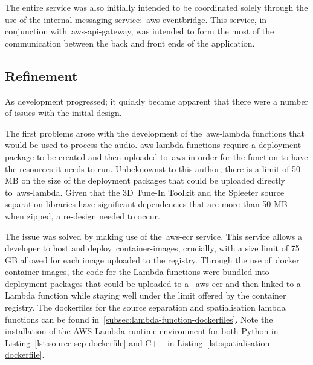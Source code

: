 The entire service was also initially intended
to be coordinated solely through the use of the internal messaging service:~\gls{aws-eventbridge}.
This service, in conjunction with~\gls{aws-api-gateway},
was intended to form the most of the communication between the back and front ends of the application.

\subsection{Refinement}\label{subsec:refinement}

As development progressed; it quickly became apparent that there were a number of issues with the initial design.

The first problems arose with the development of the~\gls{aws-lambda} functions that would be used to process the audio.
\gls{aws-lambda} functions
require a deployment package to be created
and then uploaded to~\gls{aws} in order for the function to have the resources it needs to run.
Unbeknownst to this author,
there is a limit of 50 MB on the size of the deployment packages that could be uploaded directly to~\gls{aws-lambda}.
Given that the 3D Tune-In Toolkit and the Spleeter source separation libraries have significant dependencies
that are more than 50 MB when zipped, a re-design needed to occur.

The issue was solved by making use of the~\gls{aws-ecr} service.
This service allows a developer to host and deploy~\glspl{container-image},
crucially, with a size limit of 75 GB allowed for each image uploaded to the registry.
Through the use of~\gls{docker} container images,
the code for the Lambda functions were bundled into deployment packages
that could be uploaded to a
~\gls{aws-ecr} and then linked to a Lambda function
while staying well under the limit offered by the container registry.
The dockerfiles for the source separation and spatialisation lambda functions can be found in~\ref{subsec:lambda-function-dockerfiles}.
Note the installation of the AWS Lambda runtime environment for both Python in Listing~\ref{lst:source-sep-dockerfile} and C++ in Listing~\ref{lst:spatialisation-dockerfile}.

